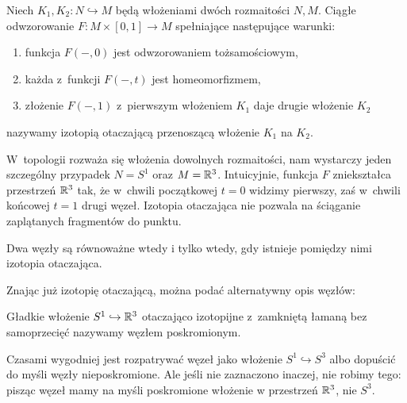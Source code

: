 \begin{definition}
    Niech $K_1, K_2 \colon N \hookrightarrow M$ będą włożeniami dwóch rozmaitości $N, M$.
    Ciągłe odwzorowanie $F \colon M \times [0,1] \to M$ spełniające następujące warunki:
    \begin{enumerate}
        \item funkcja $F(-, 0)$ jest odwzorowaniem tożsamościowym,
        \item każda z~funkcji $F(-, t)$ jest homeomorfizmem,
        \item złożenie $F(-, 1)$ z~pierwszym włożeniem $K_1$ daje drugie włożenie $K_2$
    \end{enumerate}
    nazywamy izotopią otaczającą przenoszącą włożenie $K_1$ na $K_2$.
\end{definition}

W~topologii rozważa się włożenia dowolnych rozmaitości, nam wystarczy jeden szczególny przypadek $N = S^1$ oraz $M = \mathbb R^3$.
Intuicyjnie, funkcja $F$ zniekształca przestrzeń $\mathbb R^3$ tak, że w~chwili początkowej $t = 0$ widzimy pierwszy, zaś w~chwili końcowej $t = 1$ drugi węzeł.
Izotopia otaczająca nie pozwala na ściąganie zaplątanych fragmentów do punktu.

\begin{definition}
    Dwa węzły są równoważne wtedy i tylko wtedy, gdy istnieje pomiędzy nimi izotopia otaczająca.
\end{definition}

Znając już izotopię otaczającą, można podać alternatywny opis węzłów:

\begin{definition}[węzeł]
%
\label{def:knot}%
    Gładkie włożenie $S^1 \hookrightarrow \mathbb R^3$ otaczająco izotopijne z~zamkniętą łamaną bez samoprzecięć nazywamy węzłem poskromionym.
\end{definition}

Czasami wygodniej jest rozpatrywać węzeł jako włożenie $S^1 \hookrightarrow S^3$ albo dopuścić do myśli węzły nieposkromione.
Ale jeśli nie zaznaczono inaczej, nie robimy tego: pisząc węzeł mamy na myśli poskromione włożenie w przestrzeń $\mathbb R^3$, nie $S^3$.

